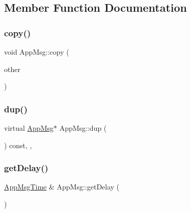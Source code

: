 \subsection{Member Function Documentation}
\mbox{\label{classAppMsg_a2d5c5dacc13f5e7959467693cd0beda9}} 
\subsubsection{\texorpdfstring{copy()}{copy()}}
{\footnotesize\ttfamily void App\+Msg\+::copy (\begin{DoxyParamCaption}\item[{const \hyperlink{classAppMsg}{App\+Msg} \&}]{other }\end{DoxyParamCaption})\hspace{0.3cm}{\ttfamily [private]}}

\mbox{\label{classAppMsg_ab4d1256f22c1ee48aec128e558a03940}} 
\subsubsection{\texorpdfstring{dup()}{dup()}}
{\footnotesize\ttfamily virtual \hyperlink{classAppMsg}{App\+Msg}$\ast$ App\+Msg\+::dup (\begin{DoxyParamCaption}{ }\end{DoxyParamCaption}) const\hspace{0.3cm}{\ttfamily [inline]}, {\ttfamily [override]}, {\ttfamily [virtual]}}

\mbox{\label{classAppMsg_aa45e97cdd014921d271665e856c642cc}} 
\subsubsection{\texorpdfstring{get\+Delay()}{getDelay()}\hspace{0.1cm}{\footnotesize\ttfamily [1/2]}}
{\footnotesize\ttfamily \hyperlink{AppMsg__m_8h_afd955b091e7d9b98cff80a090db1eb09}{App\+Msg\+Time} \& App\+Msg\+::get\+Delay (\begin{DoxyParamCaption}{ }\end{DoxyParamCaption})\hspace{0.3cm}{\ttfamily [virtual]}}

